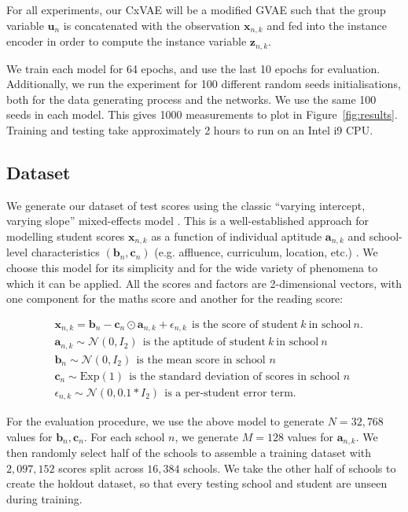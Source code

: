 \documentclass{article} %
\begin{document}
For all experiments, our CxVAE will be a modified GVAE such that the group variable $\mathbf{u}_n$ is concatenated with the observation $\mathbf{x}_{n,k}$ and fed into the instance encoder in order to compute the instance variable $\mathbf{z}_{n,k}$.

We train each model for 64 epochs, and use the last 10 epochs for evaluation. Additionally, we run the experiment for 100 different random seeds initialisations, both for the data generating process and the networks. We use the same 100 seeds in each model. This gives 1000 measurements to plot in Figure~\ref{fig:results}. Training and testing take approximately 2 hours to run on an Intel i9 CPU.

\subsection{Dataset}
\label{sec:dataset}

We generate our dataset of test scores using the classic ``varying intercept, varying slope'' mixed-effects model \citep{Laird1982Random, Pinheiro2001MixedEffectsMI, Gelman2006Data}. This is a well-established approach for modelling student scores $\mathbf{x}_{n,k}$ as a function of individual aptitude $\mathbf{a}_{n,k}$ and school-level characteristics $(\mathbf{b}_n, \mathbf{c}_n)$ (e.g. affluence, curriculum, location, etc.) \citep{Raudenbush1995TheEO, Braun2006ComparingPS}. We choose this model for its simplicity and for the wide variety of phenomena to which it can be applied. All the scores and factors are 2-dimensional vectors, with one component for the maths score and another for the reading score:

\begin{align} \label{eq:score}
& \mathbf{x}_{n,k} = \mathbf{b}_n - \mathbf{c}_n \odot \mathbf{a}_{n,k} + \epsilon_{n,k} ~~ \text{is the score of student} ~ k ~ \text{in school} ~ n.\\
& \mathbf{a}_{n,k} \sim \mathcal{N} (0,I_2) ~~ \text{is the aptitude of student} ~ k ~ \text{in school} ~ n\\
& \mathbf{b}_n \sim \mathcal{N} (0,I_2) ~~ \text{is the mean score in school } n\\
& \mathbf{c}_n \sim \mathrm{Exp} (1) ~~ \text{is the standard deviation of scores in school } n\\
& \epsilon_{n,k} \sim \mathcal{N} (0, 0.1 * I_2) ~~ \text{is a per-student error term.}
\end{align}

For the evaluation procedure, we use the above model to generate $N=32,768$ values for $\mathbf{b}_n, \mathbf{c}_n$. For each school $n$, we generate $M=128$ values for $\mathbf{a}_{n,k}$. We then randomly select half of the schools to assemble a training dataset with $2,097,152$ scores split across $16,384$ schools. We take the other half of schools to create the holdout dataset, so that every testing school and student are unseen during training. 
\end{document}
